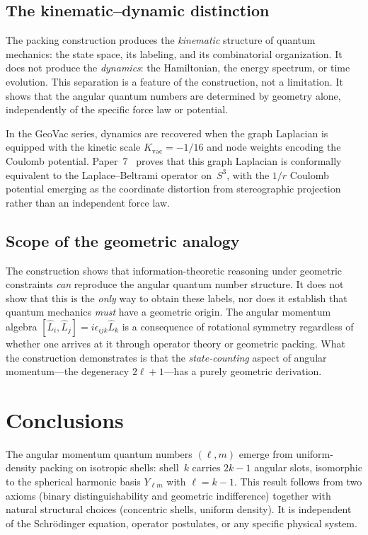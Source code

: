 \documentclass[aps,prl,reprint,amsmath,amssymb]{revtex4-2}
\begin{document}
\subsection{The kinematic--dynamic distinction}

The packing construction produces the \emph{kinematic} structure of
quantum mechanics: the state space, its labeling, and its
combinatorial organization.  It does not produce the \emph{dynamics}:
the Hamiltonian, the energy spectrum, or time evolution.  This
separation is a feature of the construction, not a limitation.  It
shows that the angular quantum numbers are determined by geometry
alone, independently of the specific force law or potential.

In the GeoVac series, dynamics are recovered when the graph Laplacian
is equipped with the kinetic scale $K_{\mathrm{vac}} = -1/16$ and
node weights encoding the Coulomb potential.  Paper~7~\cite{paper7}
proves that this graph Laplacian is conformally equivalent to the
Laplace--Beltrami operator on~$S^3$, with the $1/r$ Coulomb potential
emerging as the coordinate distortion from stereographic projection
rather than an independent force law.

\subsection{Scope of the geometric analogy}

The construction shows that information-theoretic reasoning under
geometric constraints \emph{can} reproduce the angular quantum number
structure.  It does not show that this is the \emph{only} way to
obtain these labels, nor does it establish that quantum mechanics
\emph{must} have a geometric origin.  The angular momentum algebra
$[\hat{L}_i, \hat{L}_j] = i\epsilon_{ijk}\hat{L}_k$ is a consequence
of rotational symmetry regardless of whether one arrives at it through
operator theory or geometric packing.  What the construction
demonstrates is that the \emph{state-counting} aspect of angular
momentum---the degeneracy $2\ell + 1$---has a purely geometric
derivation.


\section{Conclusions}
\label{sec:conclusions}

The angular momentum quantum numbers $(\ell, m)$ emerge from
uniform-density packing on isotropic shells: shell~$k$ carries
$2k - 1$ angular slots, isomorphic to the spherical harmonic basis
$Y_{\ell m}$ with $\ell = k - 1$.  This result follows from two
axioms (binary distinguishability and geometric indifference) together
with natural structural choices (concentric shells, uniform density).
It is independent of the Schr\"odinger equation, operator postulates,
or any specific physical system.
\end{document}
